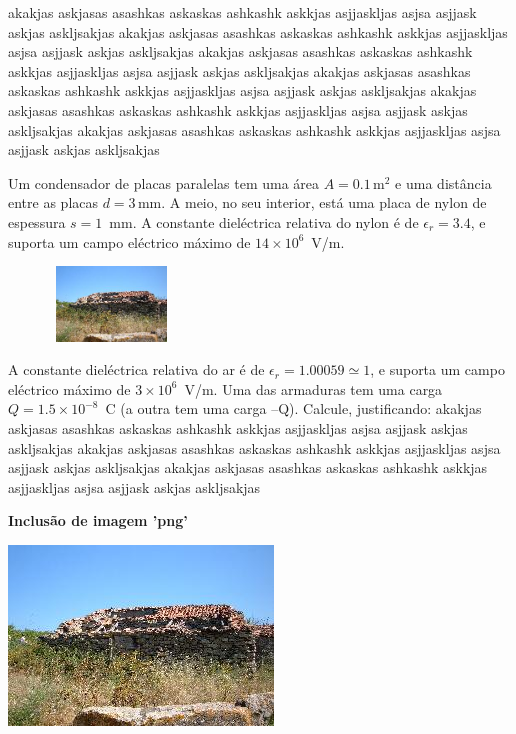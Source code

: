 \documentclass[a4paper,12pt]{article}
\begin{document}
\begin{enumerate}
   akakjas askjasas asashkas askaskas ashkashk askkjas  asjjaskljas asjsa asjjask askjas askljsakjas
   akakjas askjasas asashkas askaskas ashkashk askkjas  asjjaskljas asjsa asjjask askjas askljsakjas
 akakjas askjasas asashkas askaskas ashkashk askkjas  asjjaskljas asjsa asjjask askjas askljsakjas
   akakjas askjasas asashkas askaskas ashkashk askkjas  asjjaskljas asjsa asjjask askjas askljsakjas
 akakjas askjasas asashkas askaskas ashkashk askkjas  asjjaskljas asjsa asjjask askjas askljsakjas
   akakjas askjasas asashkas askaskas ashkashk askkjas  asjjaskljas asjsa asjjask askjas askljsakjas
\end{enumerate}

\break
   
Um condensador de placas paralelas tem uma área $A = 0.1\,$m$^2$ e uma distância
entre as placas $d = 3\,$mm. A meio, no seu interior, está uma placa de nylon de espessura
$s = 1$~mm. A constante dieléctrica relativa do nylon é de $\epsilon_r = 3.4$,
e suporta um campo eléctrico máximo de $14 \times 10^6$~V/m.

\begin{figure}
\centering
\includegraphics[width=0.3\textwidth, height=2cm, scale=1, angle=0]{dscf1683b_v1.png}
\end{figure}
A constante dieléctrica relativa do ar é de $\epsilon_r = 1.00059 \simeq 1$, e suporta
um campo eléctrico máximo de $3 \times 10^6$~V/m. Uma das armaduras tem uma carga
$Q = 1.5 \times 10^{-8}$~C (a outra tem uma carga --Q). Calcule, justificando:
   akakjas askjasas asashkas askaskas ashkashk askkjas  asjjaskljas asjsa asjjask askjas askljsakjas
 akakjas askjasas asashkas askaskas ashkashk askkjas  asjjaskljas asjsa asjjask askjas askljsakjas
   akakjas askjasas asashkas askaskas ashkashk askkjas  asjjaskljas asjsa asjjask askjas askljsakjas

\vskip 10mm
\centerline{\Large\bf Inclusão de imagem 'png'}
\par\vskip 5mm
\includegraphics{dscf1683b_v1.png}
\end{document}
